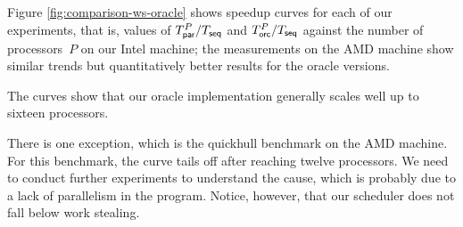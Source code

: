 Figure \ref{fig:comparison-ws-oracle} shows speedup curves for each of
our experiments, that is, values of $T_{\textsf{par}}^{P}/T_{\textsf{seq}}$ and 
$T_{\textsf{orc}}^{P}/T_{\textsf{seq}}$ against the number of processors~$P$ on our
Intel machine; the measurements on the AMD machine show similar trends
but quantitatively better results for the oracle versions.   

The curves show that our oracle implementation generally scales
well up to sixteen processors.

There is one exception, which is the quickhull benchmark on the AMD
machine. For this benchmark, the curve tails off after reaching twelve
processors. We need to conduct further experiments to understand the
cause, which is probably due to a lack of parallelism in the program.
Notice, however, that our scheduler does not fall below work stealing.






